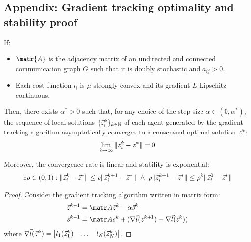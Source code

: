 \begin{subappendices}

\section{Appendix: Gradient tracking optimality and stability proof}

\begin{theorem} 
    If:
    \begin{itemize}
        \item $\matr{A}$ is the adjacency matrix of an undirected and connected communication graph $G$ such that it is doubly stochastic and $a_{ij} > 0$.
        \item Each cost function $l_i$ is $\mu$-strongly convex and its gradient $L$-Lipschitz continuous.
    \end{itemize}
    Then, there exists $\alpha^* > 0$ such that, for any choice of the step size $\alpha \in (0, \alpha^*)$, the sequence of local solutions $\{ {\vec{z}}_i^k \}_{k \in \mathbb{N}}$ of each agent generated by the gradient tracking algorithm asymptotically converges to a consensual optimal solution ${\vec{z}}^*$:
    \[ \lim_{k \rightarrow \infty} \Vert {\vec{z}}_i^k - {\vec{z}}^* \Vert = 0 \]
    
    Moreover, the convergence rate is linear and stability is exponential:
    \[ 
        \exists \rho \in (0,1): \Vert {\vec{z}}_i^k - {\vec{z}}^* \Vert \leq \rho \Vert {\vec{z}}_i^{k+1} - {\vec{z}}^* \Vert
        \,\,\land\,\,
        \rho \Vert {\vec{z}}_i^{k+1} - {\vec{z}}^* \Vert \leq \rho^k \Vert {\vec{z}}_i^0 - {\vec{z}}^* \Vert
    \]

    \begin{proof}
        Consider the gradient tracking algorithm written in matrix form:
        \[
            \begin{aligned}
                \z^{k+1} &= \A \z^k - \alpha \s^k \\
                \s^{k+1} &= \A \s^k + (\nabla \vec{l}(\z^{k+1}) - \nabla \vec{l}(\z^k))
            \end{aligned}
        \]
        where $\nabla \vec{l}({\vec{z}}^k) = \begin{bmatrix} l_1({\vec{z}}^k_1) & \dots & l_N({\vec{z}}^k_N) \end{bmatrix}$.



\end{proof}
\end{theorem}
\end{subappendices}
